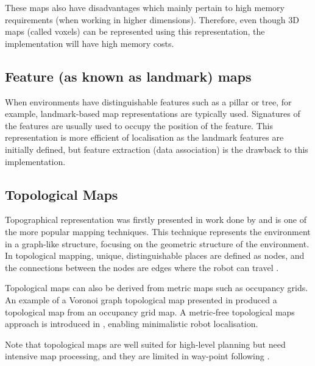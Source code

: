 These maps also have disadvantages which mainly pertain to high memory requirements (when working in higher dimensions). Therefore, even though 3D maps (called voxels) can be represented using this representation, the implementation will have high memory costs\cite{Saeedi}.

\subsection{Feature (as known as landmark) maps}
When environments have distinguishable features such as a pillar or tree, for example, landmark-based map representations are typically used. Signatures of the features are usually used to occupy the position of the feature. This representation is more efficient of localisation as the landmark features are initially defined, but feature extraction (data association) is the drawback to this implementation\cite{Siciliano2008b}.
\subsection{Topological Maps}
Topographical representation was firstly presented in work done by \cite{Kuipers1991} and is one of the more popular mapping techniques. This technique represents the environment in a graph-like structure, focusing on the geometric structure of the environment. In topological mapping, unique, distinguishable places are defined as nodes, and the connections between the nodes are edges where the robot can travel \cite{Siciliano2008b}. 

Topological maps can also be derived from metric maps such as occupancy grids. An example of a Voronoi graph topological map presented in \cite{2005i} produced a topological map from an occupancy grid map. A metric-free topological maps approach is introduced in \cite{Derenick2013}, enabling minimalistic robot localisation.

Note that topological maps are well suited for high-level planning but need intensive map processing, and they are limited in way-point following \cite{Saeedi}.

